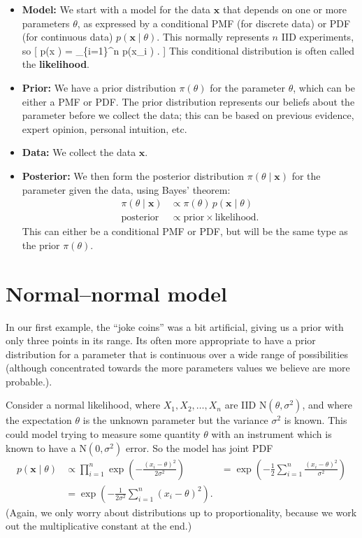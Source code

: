 \documentclass[
  letterpaper,
]{report}
\providecommand{\tightlist}{%
  \setlength{\itemsep}{0pt}\setlength{\parskip}{0pt}}\usepackage{longtable,booktabs,array}
\theoremstyle{definition}
\theoremstyle{definition}
\theoremstyle{remark}
\begin{document}
\begin{itemize}
\tightlist
\item
  \textbf{Model:} We start with a model for the data \(\mathbf x\) that
  depends on one or more parameters \(\theta\), as expressed by a
  conditional PMF (for discrete data) or PDF (for continuous data)
  \(p(\mathbf x \mid \theta)\). This normally represents \(n\) IID
  experiments, so {[} p(\mathbf x \mid \theta) = \prod\_\{i=1\}\^{}n
  p(x\_i \mid \theta) . {]} This conditional distribution is often
  called the \textbf{likelihood}.
\item
  \textbf{Prior:} We have a prior distribution \(\pi(\theta)\) for the
  parameter \(\theta\), which can be either a PMF or PDF. The prior
  distribution represents our beliefs about the parameter before we
  collect the data; this can be based on previous evidence, expert
  opinion, personal intuition, etc.
\item
  \textbf{Data:} We collect the data \(\mathbf x\).
\item
  \textbf{Posterior:} We then form the posterior distribution
  \(\pi(\theta \mid \mathbf x)\) for the parameter given the data, using
  Bayes' theorem: \begin{align*}
  \pi(\theta \mid \mathbf x) &\propto \pi(\theta)\, p(\mathbf x \mid \theta) \\
  \text{posterior} &\propto \text{prior} \times \text{likelihood} .
  \end{align*} This can either be a conditional PMF or PDF, but will be
  the same type as the prior \(\pi(\theta)\).
\end{itemize}

\hypertarget{normal-normal}{%
\section{Normal--normal model}\label{normal-normal}}

In our first example, the ``joke coins'' was a bit artificial, giving us
a prior with only three points in its range. Its often more appropriate
to have a prior distribution for a parameter that is continuous over a
wide range of possibilities (although concentrated towards the more
parameters values we believe are more probable.).

Consider a normal likelihood, where \(X_1, X_2, \dots, X_n\) are IID
\(\text{N}(\theta, \sigma^2)\), and where the expectation \(\theta\) is
the unknown parameter but the variance \(\sigma^2\) is known. This could
model trying to measure some quantity \(\theta\) with an instrument
which is known to have a \(\text{N}(0,\sigma^2)\) error. So the model
has joint PDF \begin{align*}
p(\mathbf x \mid \theta)
  &\propto \prod_{i=1}^n \exp \left(- \frac{(x_i - \theta)^2}{2\sigma^2}\right)
  &= \exp \left( - \frac{1}{2} \sum_{i=1}^n \frac{(x_i - \theta)^2}{\sigma^2} \right) \\
  &= \exp \left( - \frac{1}{2\sigma^2} \sum_{i=1}^n (x_i - \theta)^2 \right).
\end{align*} (Again, we only worry about distributions up to
proportionality, because we work out the multiplicative constant at the
end.)
\end{document}
